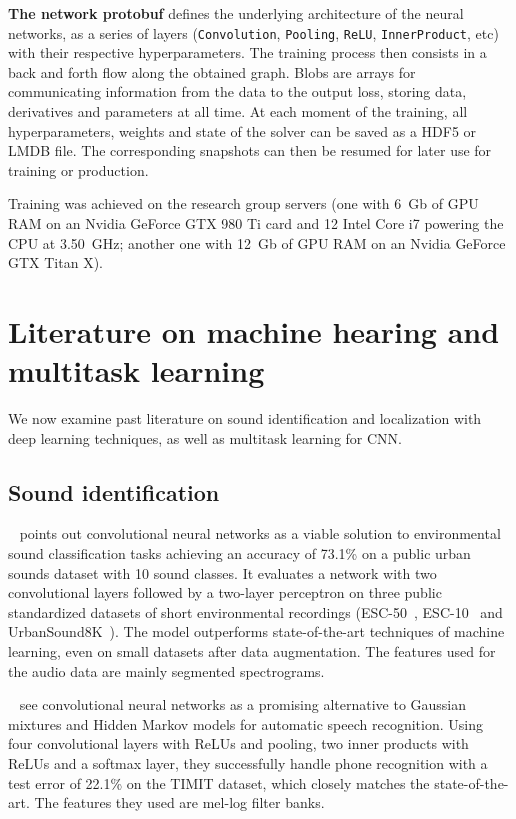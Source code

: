 \textbf{The network protobuf} defines the underlying architecture of the neural networks, as a series of layers (\verb+Convolution+, \verb+Pooling+, \verb+ReLU+, \verb+InnerProduct+, etc) with their respective hyperparameters. The training process then consists in a back and forth flow along the obtained graph. Blobs are arrays for communicating information from the data to the output loss, storing data, derivatives and parameters at all time. At each moment of the training, all hyperparameters, weights and state of the solver can be saved as a HDF5 or LMDB file. The corresponding snapshots can then be resumed for later use for training or production.

Training was achieved on the research group servers (one with 6~Gb of GPU RAM on an Nvidia GeForce GTX 980 Ti card and 12 Intel Core i7 powering the CPU at 3.50~GHz; another one with 12~Gb of GPU RAM on an Nvidia GeForce GTX Titan X).


\section{Literature on machine hearing and multitask learning}

We now examine past literature on sound identification and localization with deep learning techniques, as well as multitask learning for CNN.

\subsection{Sound identification}

\citeauthor{piczak2015environmental}~\parencite{piczak2015environmental} points out convolutional neural networks as a viable solution to environmental sound classification tasks achieving an accuracy of 73.1\% on a public urban sounds dataset with 10 sound classes. It evaluates a network with two convolutional layers followed by a two-layer perceptron on three public standardized datasets of short environmental recordings (ESC-50~\parencite{piczak2015esc}, ESC-10~\parencite{piczak2015esc} and UrbanSound8K~\parencite{salamon2014dataset}). The model outperforms state-of-the-art techniques of machine learning, even on small datasets after data augmentation. The features used for the audio data are mainly segmented spectrograms.

\citeauthor{songend}~\parencite{songend} see convolutional neural networks as a promising alternative to Gaussian mixtures and Hidden Markov models for automatic speech recognition. Using four convolutional layers with ReLUs and pooling, two inner products with ReLUs and a softmax layer, they successfully handle phone recognition with a test error of 22.1\% on the TIMIT dataset, which closely matches the state-of-the-art. The features they used are mel-log filter banks.


